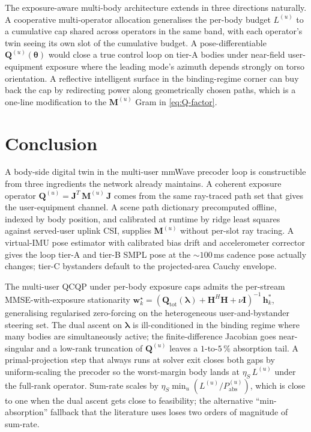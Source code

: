 \documentclass[journal,twocolumn,10pt]{IEEEtran}
\theoremstyle{plain}
\theoremstyle{remark}
\newcommand{\hh}{\mathbf{h}}
\newcommand{\ww}{\mathbf{w}}
\newcommand{\Pabs}{P_{\mathrm{abs}}}
\newcommand{\Qmat}{\mathbf{Q}}
\newcommand{\Mmat}{\mathbf{M}}
\newcommand{\Jmat}{\mathbf{J}}
\begin{document}
The exposure-aware multi-body architecture extends in three
directions naturally. A cooperative multi-operator allocation
generalises the per-body budget $L^{(u)}$ to a cumulative cap shared
across operators in the same band, with each operator's twin seeing
its own slot of the cumulative budget. A pose-differentiable
$\Qmat^{(u)}(\bm\theta)$ would close a true control loop on tier-A
bodies under near-field user-equipment exposure where the leading
mode's azimuth depends strongly on torso orientation. A reflective
intelligent surface in the binding-regime corner can buy back the
cap by redirecting power along geometrically chosen paths, which is
a one-line modification to the $\Mmat^{(u)}$ Gram in
\cref{eq:Q-factor}.


\section{Conclusion}\label{sec:conclusion}

A body-side digital twin in the multi-user mmWave precoder loop is
constructible from three ingredients the network already maintains.
A coherent exposure operator
$\Qmat^{(u)} = \Jmat^T\,\Mmat^{(u)}\,\Jmat$ comes from the same
ray-traced path set that gives the user-equipment channel. A scene
path dictionary precomputed offline, indexed by body position, and
calibrated at runtime by ridge least squares against served-user
uplink CSI, supplies $\Mmat^{(u)}$ without per-slot ray tracing. A
virtual-IMU pose estimator with calibrated bias drift and
accelerometer corrector gives the loop tier-A and tier-B SMPL pose
at the $\sim 100\,$ms cadence pose actually changes; tier-C
bystanders default to the projected-area Cauchy envelope.

The multi-user QCQP under per-body exposure caps admits the
per-stream MMSE-with-exposure stationarity
$\ww_k^\star = (\Qmat_{\mathrm{tot}}(\bm\lambda) + \mathbf{H}^H
\mathbf{H} + \nu \mathbf{I})^{-1}\,\hh_k^*$, generalising regularised
zero-forcing on the heterogeneous user-and-bystander steering set.
The dual ascent on $\bm\lambda$ is ill-conditioned in the binding
regime where many bodies are simultaneously active; the
finite-difference Jacobian goes near-singular and a low-rank
truncation of $\Qmat^{(u)}$ leaves a $1$-to-$5\,\%$ absorption tail.
A primal-projection step that always runs at solver exit closes
both gaps by uniform-scaling the precoder so the worst-margin body
lands at $\eta_S\,L^{(u)}$ under the full-rank operator. Sum-rate
scales by $\eta_S \min_u(L^{(u)}/\Pabs^{(u)})$, which is close to
one when the dual ascent gets close to feasibility; the alternative
``min-absorption'' fallback that the literature uses loses two
orders of magnitude of sum-rate.
\end{document}
